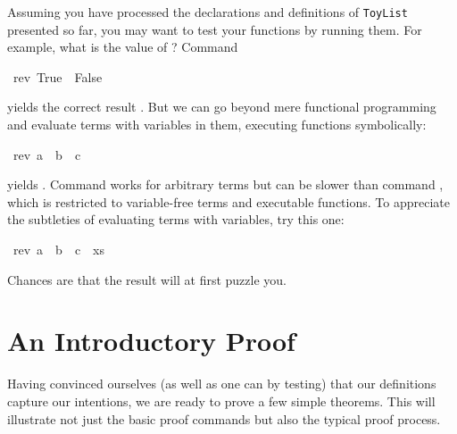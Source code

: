 \begin{isabellebody}
\begin{isamarkuptext}
Assuming you have processed the declarations and definitions of
\texttt{ToyList} presented so far, you may want to test your
functions by running them. For example, what is the value of
? Command%
\end{isamarkuptext}%
\isamarkuptrue%
\isamarkupfalse%
\ {\isachardoublequoteopen}rev\ {\isacharparenleft}True\ {\isacharhash}\ False\ {\isacharhash}\ {\isacharbrackleft}{\isacharbrackright}{\isacharparenright}{\isachardoublequoteclose}%
\begin{isamarkuptext}%
\noindent yields the correct result .
But we can go beyond mere functional programming and evaluate terms with
variables in them, executing functions symbolically:%
\end{isamarkuptext}%
\isamarkuptrue%
\isamarkupfalse%
\ {\isachardoublequoteopen}rev\ {\isacharparenleft}a\ {\isacharhash}\ b\ {\isacharhash}\ c\ {\isacharhash}\ {\isacharbrackleft}{\isacharbrackright}{\isacharparenright}{\isachardoublequoteclose}%
\begin{isamarkuptext}%
\noindent yields .
Command  works for arbitrary terms
but can be slower than command ,
which is restricted to variable-free terms and executable functions.
To appreciate the subtleties of evaluating terms with variables,
try this one:%
\end{isamarkuptext}%
\isamarkuptrue%
\isamarkupfalse%
\ {\isachardoublequoteopen}rev\ {\isacharparenleft}a\ {\isacharhash}\ b\ {\isacharhash}\ c\ {\isacharhash}\ xs{\isacharparenright}{\isachardoublequoteclose}%
\begin{isamarkuptext}%
\noindent Chances are that the result will at first puzzle you.

\section{An Introductory Proof}
\label{sec:intro-proof}

Having convinced ourselves (as well as one can by testing) that our
definitions capture our intentions, we are ready to prove a few simple
theorems. This will illustrate not just the basic proof commands but
also the typical proof process.


\end{isamarkuptext}
\end{isabellebody}
